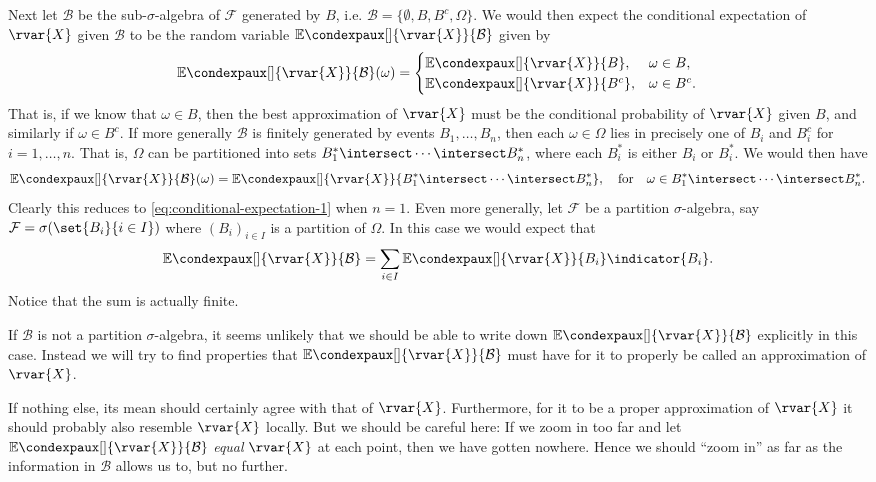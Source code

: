 \documentclass[article, a4paper, 11pt, oneside]{memoir}
\numberwithin{equation}{chapter}
\newcommand{\calB}{\mathcal{B}}
\newcommand{\calF}{\mathcal{F}}
\newcommand{\condexp}[3][]{{\mathbb{E}\condexpaux[#1]{#2}{#3}}}
\begin{document}
Next let $\calB$ be the sub-$\sigma$-algebra of $\calF$ generated by $B$, i.e. $\calB = \{ \emptyset, B, B^c, \Omega \}$. We would then expect the conditional expectation of $\rvar{X}$ given $\calB$ to be the random variable $\condexp{\rvar{X}}{\calB}$ given by
%
\begin{equation}
    \label{eq:conditional-expectation-1}
    \condexp{\rvar{X}}{\calB}(\omega)
        =
        \begin{cases}
            \condexp{\rvar{X}}{B},   & \omega \in B, \\
            \condexp{\rvar{X}}{B^c}, & \omega \in B^c.
        \end{cases}
\end{equation}
%
That is, if we know that $\omega \in B$, then the best approximation of $\rvar{X}$ must be the conditional probability of $\rvar{X}$ given $B$, and similarly if $\omega \in B^c$. If more generally $\calB$ is finitely generated by events $B_1, \ldots, B_n$, then each $\omega \in \Omega$ lies in precisely one of $B_i$ and $B_i^c$ for $i = 1, \ldots, n$. That is, $\Omega$ can be partitioned into sets $B_1^* \intersect \cdots \intersect B_n^*$, where each $B_i^*$ is either $B_i$ or $B_i^*$. We would then have
%
\begin{equation*}
    \condexp{\rvar{X}}{\calB}(\omega)
        = \condexp{\rvar{X}}{ B_1^* \intersect \cdots \intersect B_n^* },
        \quad \text{for} \quad
        \omega \in B_1^* \intersect \cdots \intersect B_n^*.
\end{equation*}
%
Clearly this reduces to \cref{eq:conditional-expectation-1} when $n = 1$. Even more generally, let $\calF$ be a partition $\sigma$-algebra, say $\calF = \sigma( \set{B_i}{i \in I} )$ where $(B_i)_{i \in I}$ is a partition of $\Omega$. In this case we would expect that
%
\begin{equation*}
    \condexp{\rvar{X}}{\calB}
        = \sum_{i \in I} \condexp{\rvar{X}}{B_i} \indicator{B_i}.
\end{equation*}
%
Notice that the sum is actually finite.

If $\calB$ is not a partition $\sigma$-algebra, it seems unlikely that we should be able to write down $\condexp{\rvar{X}}{\calB}$ explicitly in this case. Instead we will try to find properties that $\condexp{\rvar{X}}{\calB}$ must have for it to properly be called an approximation of $\rvar{X}$.

If nothing else, its mean should certainly agree with that of $\rvar{X}$. Furthermore, for it to be a proper approximation of $\rvar{X}$ it should probably also resemble $\rvar{X}$ locally. But we should be careful here: If we zoom in too far and let $\condexp{\rvar{X}}{\calB}$ \emph{equal} $\rvar{X}$ at each point, then we have gotten nowhere. Hence we should \enquote{zoom in} as far as the information in $\calB$ allows us to, but no further.
\end{document}
